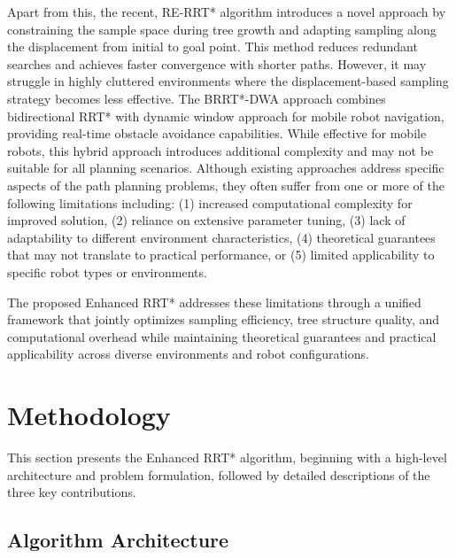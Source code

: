 \documentclass[pdflatex,sn-mathphys-num]{sn-jnl}
\theoremstyle{thmstyleone}%
\theoremstyle{thmstyletwo}%
\theoremstyle{thmstylethree}%
\begin{document}
 Apart from this, the recent, RE-RRT* algorithm \cite{29} introduces a novel approach by constraining the sample space during tree growth and adapting sampling along the displacement from initial to goal point. This method reduces redundant searches and achieves faster convergence with shorter paths. However, it may struggle in highly cluttered environments where the displacement-based sampling strategy becomes less effective. The BRRT*-DWA approach \cite{30} combines bidirectional RRT* with dynamic window approach for mobile robot navigation, providing real-time obstacle avoidance capabilities. While effective for mobile robots, this hybrid approach introduces additional complexity and may not be suitable for all planning scenarios. Although existing approaches address specific aspects of the path planning problems, they often suffer from one or more of the following limitations including: (1) increased computational complexity for improved solution, (2) reliance on extensive parameter tuning, (3) lack of adaptability to different environment characteristics, (4) theoretical guarantees that may not translate to practical performance, or (5) limited applicability to specific robot types or environments.

The proposed Enhanced RRT* addresses these limitations through a unified framework that jointly optimizes sampling efficiency, tree structure quality, and computational overhead while maintaining theoretical guarantees and practical applicability across diverse environments and robot configurations.

\section{Methodology}\label{sec3}

This section presents the Enhanced RRT* algorithm, beginning with a high-level architecture and problem formulation, followed by detailed descriptions of the three key contributions.

\subsection{Algorithm Architecture}\label{subsec1}
\end{document}
